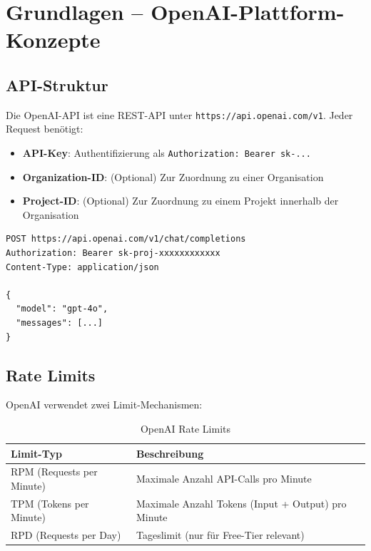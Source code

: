 \section{Grundlagen -- OpenAI-Plattform-Konzepte}

\subsection{API-Struktur}

Die OpenAI-API ist eine REST-API unter \texttt{https://api.openai.com/v1}. Jeder Request benötigt:

\begin{itemize}[leftmargin=*]
    \item \textbf{API-Key}: Authentifizierung als \texttt{Authorization: Bearer sk-...}
    \item \textbf{Organization-ID}: (Optional) Zur Zuordnung zu einer Organisation
    \item \textbf{Project-ID}: (Optional) Zur Zuordnung zu einem Projekt innerhalb der Organisation
\end{itemize}

\begin{verbatim}
POST https://api.openai.com/v1/chat/completions
Authorization: Bearer sk-proj-xxxxxxxxxxxx
Content-Type: application/json

{
  "model": "gpt-4o",
  "messages": [...]
}
\end{verbatim}

\subsection{Rate Limits}

OpenAI verwendet zwei Limit-Mechanismen:

\begin{table}[H]
\centering
\begin{tabularx}{\linewidth}{lX}
\toprule
\textbf{Limit-Typ} & \textbf{Beschreibung} \\
\midrule
RPM (Requests per Minute) & Maximale Anzahl API-Calls pro Minute \\
TPM (Tokens per Minute) & Maximale Anzahl Tokens (Input + Output) pro Minute \\
RPD (Requests per Day) & Tageslimit (nur für Free-Tier relevant) \\
\bottomrule
\end{tabularx}
\caption{OpenAI Rate Limits}
\label{tab:rate-limits}
\end{table}

